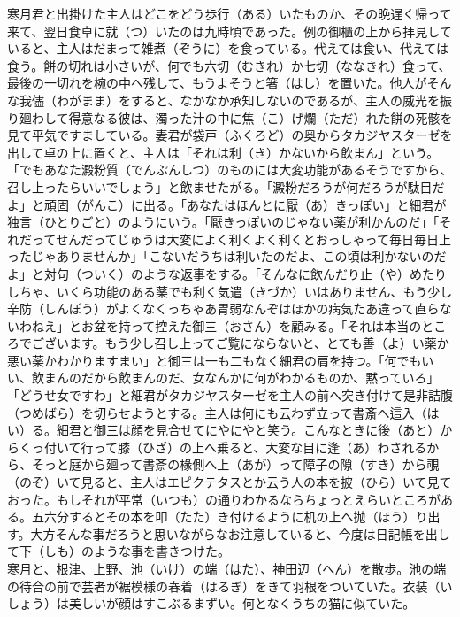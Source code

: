 \documentclass{book}
\begin{document}
寒月君と出掛けた主人はどこをどう歩行（ある）いたものか、その晩遅く帰って来て、翌日食卓に就（つ）いたのは九時頃であった。例の御櫃の上から拝見していると、主人はだまって雑煮（ぞうに）を食っている。代えては食い、代えては食う。餅の切れは小さいが、何でも六切（むきれ）か七切（ななきれ）食って、最後の一切れを椀の中へ残して、もうよそうと箸（はし）を置いた。他人がそんな我儘（わがまま）をすると、なかなか承知しないのであるが、主人の威光を振り廻わして得意なる彼は、濁った汁の中に焦（こ）げ爛（ただ）れた餅の死骸を見て平気ですましている。妻君が袋戸（ふくろど）の奥からタカジヤスターゼを出して卓の上に置くと、主人は「それは利（き）かないから飲まん」という。「でもあなた澱粉質（でんぷんしつ）のものには大変功能があるそうですから、召し上ったらいいでしょう」と飲ませたがる。「澱粉だろうが何だろうが駄目だよ」と頑固（がんこ）に出る。「あなたはほんとに厭（あ）きっぽい」と細君が独言（ひとりごと）のようにいう。「厭きっぽいのじゃない薬が利かんのだ」「それだってせんだってじゅうは大変によく利くよく利くとおっしゃって毎日毎日上ったじゃありませんか」「こないだうちは利いたのだよ、この頃は利かないのだよ」と対句（ついく）のような返事をする。「そんなに飲んだり止（や）めたりしちゃ、いくら功能のある薬でも利く気遣（きづか）いはありません、もう少し辛防（しんぼう）がよくなくっちゃあ胃弱なんぞはほかの病気たあ違って直らないわねえ」とお盆を持って控えた御三（おさん）を顧みる。「それは本当のところでございます。もう少し召し上ってご覧にならないと、とても善（よ）い薬か悪い薬かわかりますまい」と御三は一も二もなく細君の肩を持つ。「何でもいい、飲まんのだから飲まんのだ、女なんかに何がわかるものか、黙っていろ」「どうせ女ですわ」と細君がタカジヤスターゼを主人の前へ突き付けて是非詰腹（つめばら）を切らせようとする。主人は何にも云わず立って書斎へ這入（はい）る。細君と御三は顔を見合せてにやにやと笑う。こんなときに後（あと）からくっ付いて行って膝（ひざ）の上へ乗ると、大変な目に逢（あ）わされるから、そっと庭から廻って書斎の椽側へ上（あが）って障子の隙（すき）から覗（のぞ）いて見ると、主人はエピクテタスとか云う人の本を披（ひら）いて見ておった。もしそれが平常（いつも）の通りわかるならちょっとえらいところがある。五六分するとその本を叩（たた）き付けるように机の上へ抛（ほう）り出す。大方そんな事だろうと思いながらなお注意していると、今度は日記帳を出して下（しも）のような事を書きつけた。\\

寒月と、根津、上野、池（いけ）の端（はた）、神田辺（へん）を散歩。池の端の待合の前で芸者が裾模様の春着（はるぎ）をきて羽根をついていた。衣装（いしょう）は美しいが顔はすこぶるまずい。何となくうちの猫に似ていた。\\
\end{document}
